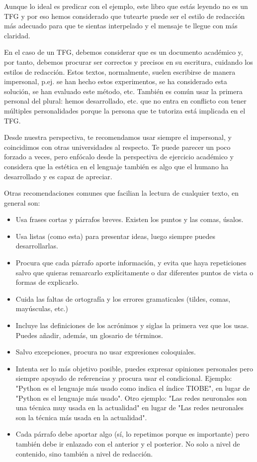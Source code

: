 
Aunque lo ideal es predicar con el ejemplo, este libro que estás leyendo no es un TFG y por eso hemos considerado que tutearte puede ser el estilo de redacción más adecuado para que te sientas interpelado y el mensaje te llegue con más claridad. 

En el caso de un TFG, debemos considerar que es un documento académico y, por tanto, debemos procurar ser correctos y precisos en su escritura, cuidando los estilos de redacción. Estos textos, normalmente, suelen escribirse de manera impersonal, p.ej. se han hecho estos experimentos, se ha considerado esta solución, se han evaluado este método, etc. También es común usar la primera personal del plural: hemos desarrollado, etc. que no entra en conflicto con tener múltiples personalidades porque la persona que te tutoriza está implicada en el TFG. 

Desde nuestra perspectiva, te recomendamos usar siempre el impersonal, y coincidimos con otras universidades al respecto. Te puede parecer un poco forzado a veces, pero enfócalo desde la perspectiva de ejercicio académico y considera que la estética en el lenguaje también es algo que el humano ha desarrollado y es capaz de apreciar.

Otras recomendaciones comunes que facilian la lectura de cualquier texto, en general son:
\begin{itemize}
    \item Usa frases cortas y párrafos breves. Existen los puntos y las comas, úsalos.
    \item Usa listas (como esta) para presentar ideas, luego siempre puedes desarrollarlas.
    \item Procura que cada párrafo aporte información, y evita que haya repeticiones salvo que quieras remarcarlo explícitamente o dar diferentes puntos de vista o formas de explicarlo.  
    \item Cuida las faltas de ortografía y los errores gramaticales (tildes, comas, mayúsculas, etc.)
    \item Incluye las definiciones de los acrónimos y siglas la primera vez que los usas. Puedes añadir, además, un glosario de términos.
    \item Salvo excepciones, procura no usar expresiones coloquiales.
    \item Intenta ser lo más objetivo posible, puedes expresar opiniones personales pero siempre apoyado de referencias y procura usar el condicional. Ejemplo: "Python es el lenguaje más usado como indica el índice TIOBE", en lugar de "Python es el lenguaje más usado". Otro ejemplo: "Las redes neuronales son una técnica muy usada en la actualidad" en lugar de "Las redes neuronales son la técnica más usada en la actualidad".
    \item Cada párrafo debe aportar algo (sí, lo repetimos porque es importante) pero también debe ir enlazado con el anterior y el posterior. No solo a nivel de contenido, sino también a nivel de redacción.
\end{itemize}

